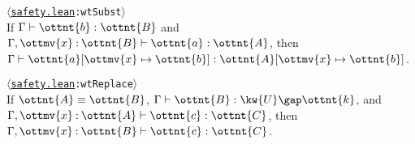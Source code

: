 \documentclass[a4paper,UKenglish,cleveref,autoref,thm-restate]{lipics-v2021}
\newcommand{\repo}{https://github.com/ionathanch/TTBFL}
\newcommand{\thmref}[2]{%
  $\langle$\href{\repo/tree/main/src/#1}{\texttt{#1}}\texttt{:#2}$\rangle$%
}
\begin{document}

\begin{lemma}[Substitution (w.t.)] \thmref{safety.lean}{wtSubst} \label{lem:wt:subst} \\
  If $ \Gamma  \vdash  \ottnt{b}  \mathrel{:}  \ottnt{B} $ and $  \Gamma ,  \ottmv{x}  \mathbin{:}  \ottnt{B}   \vdash  \ottnt{a}  \mathrel{:}  \ottnt{A} $,
  then $ \Gamma  \vdash   \ottnt{a} [  \ottmv{x}  \mapsto  \ottnt{b}  ]   \mathrel{:}   \ottnt{A} [  \ottmv{x}  \mapsto  \ottnt{b}  ]  $.
\end{lemma}


\begin{lemma}[Replacement (w.t.)] \thmref{safety.lean}{wtReplace} \label{lem:wt:replace} \\
  If $ \ottnt{A}  \equiv  \ottnt{B} $, $ \Gamma  \vdash  \ottnt{B}  \mathrel{:}   \kw{U} \gap  \ottnt{k}  $, and $  \Gamma ,  \ottmv{x}  \mathbin{:}  \ottnt{A}   \vdash  \ottnt{c}  \mathrel{:}  \ottnt{C} $,
  then $  \Gamma ,  \ottmv{x}  \mathbin{:}  \ottnt{B}   \vdash  \ottnt{c}  \mathrel{:}  \ottnt{C} $.
\end{lemma}


\end{document}
